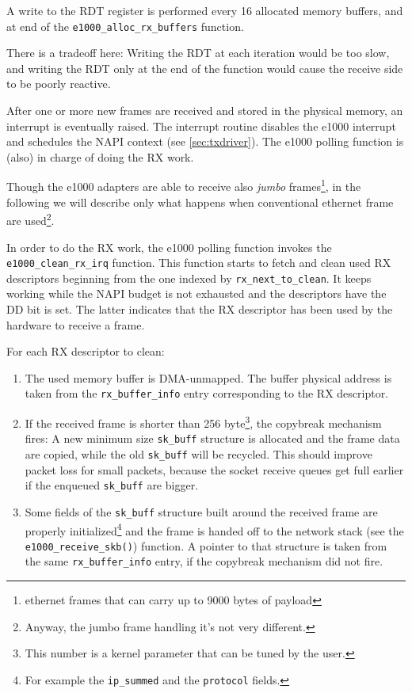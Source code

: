 A write to the RDT register is performed every 16 allocated memory buffers, and at end of the \texttt{e1000\_alloc\_rx\_buffers} function.

There is a tradeoff here: Writing the RDT at each iteration would be too slow, and writing the RDT only at the end of the function would
cause the receive side to be poorly reactive.

\vspace{0.5cm}

After one or more new frames are received and stored in the physical memory, an interrupt is eventually raised.
The interrupt routine disables the e1000 interrupt and schedules the NAPI context (see \ref{sec:txdriver}).
The e1000 polling function is (also) in charge of doing the RX work.

Though the e1000 adapters are able to receive also \emph{jumbo} frames\footnote{ethernet frames that can carry up to 9000 bytes of payload},
in the following we will describe only what happens when conventional ethernet frame are used\footnote{Anyway, the jumbo frame handling 
it's not very different.}.

In order to do the RX work, the e1000 polling function invokes the \texttt{e1000\_clean\_rx\_irq} function.
This function starts to fetch and clean used RX descriptors beginning from the one indexed by \texttt{rx\_next\_to\_clean}.
It keeps working while the NAPI budget is not exhausted and the descriptors have the DD bit is set. The latter indicates that the 
RX descriptor has been used by the hardware to receive a frame.

\vspace{0.5cm}

For each RX descriptor to clean:
\begin{enumerate}
    \item The used memory buffer is DMA-unmapped. The buffer physical address is taken from the \texttt{rx\_buffer\_info} entry
	  corresponding to the RX descriptor.

    \item If the received frame is shorter than 256 byte\footnote{This number is a kernel parameter that can be tuned by the user.},
	  the copybreak mechanism fires: A new minimum size \texttt{sk\_buff} structure is allocated and the frame data are copied,
	  while the old \texttt{sk\_buff} will be recycled. This should improve packet loss for small packets, because the socket
	  receive queues get full earlier if the enqueued \texttt{sk\_buff} are bigger.
	  
    \item Some fields of the \texttt{sk\_buff} structure built around the received frame are properly initialized\footnote{For example the
	  \texttt{ip\_summed} and the \texttt{protocol} fields.} and the frame
	  is handed off to the network stack (see the \texttt{e1000\_receive\_skb()}) function. A pointer to that structure is
	  taken from the same \texttt{rx\_buffer\_info} entry, if the copybreak mechanism did not fire.
\end{enumerate}


